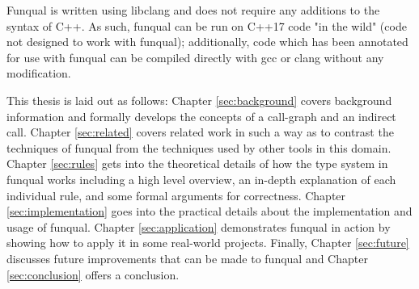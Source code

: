 Funqual is written using libclang and does not require any additions to the syntax of C++.  As such, funqual can be run on C++17 code "in the wild" (code not designed to work with funqual);  additionally, code which has been annotated for use with funqual can be compiled directly with gcc or clang without any modification.  

This thesis is laid out as follows:  Chapter \ref{sec:background} covers background information and formally develops the concepts of a call-graph and an indirect call.  Chapter \ref{sec:related} covers related work in such a way as to contrast the techniques of funqual from the techniques used by other tools in this domain.  Chapter \ref{sec:rules} gets into the theoretical details of how the type system in funqual works including a high level overview, an in-depth explanation of each individual rule, and some formal arguments for correctness.  Chapter \ref{sec:implementation} goes into the practical details about the implementation and usage of funqual.  Chapter \ref{sec:application} demonstrates funqual in action by showing how to apply it in some real-world projects.  Finally, Chapter \ref{sec:future} discusses future improvements that can be made to funqual and Chapter \ref{sec:conclusion} offers a conclusion.




